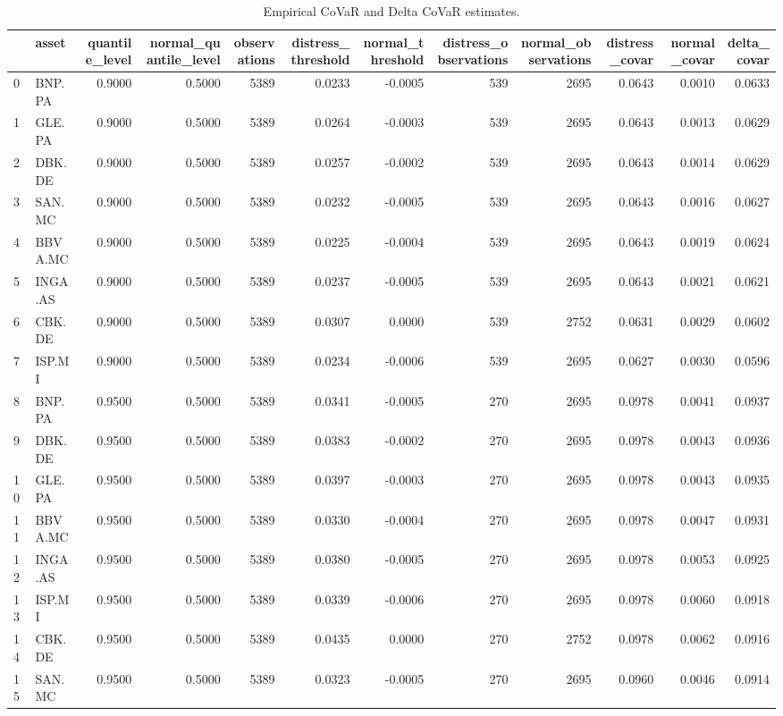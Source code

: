 \begin{table}
\caption{Empirical CoVaR and Delta CoVaR estimates.}
\label{tab:covar_empirical}
\begin{tabular}{llrrrrrrrrrr}
\toprule
 & asset & quantile_level & normal_quantile_level & observations & distress_threshold & normal_threshold & distress_observations & normal_observations & distress_covar & normal_covar & delta_covar \\
\midrule
0 & BNP.PA & 0.9000 & 0.5000 & 5389 & 0.0233 & -0.0005 & 539 & 2695 & 0.0643 & 0.0010 & 0.0633 \\
1 & GLE.PA & 0.9000 & 0.5000 & 5389 & 0.0264 & -0.0003 & 539 & 2695 & 0.0643 & 0.0013 & 0.0629 \\
2 & DBK.DE & 0.9000 & 0.5000 & 5389 & 0.0257 & -0.0002 & 539 & 2695 & 0.0643 & 0.0014 & 0.0629 \\
3 & SAN.MC & 0.9000 & 0.5000 & 5389 & 0.0232 & -0.0005 & 539 & 2695 & 0.0643 & 0.0016 & 0.0627 \\
4 & BBVA.MC & 0.9000 & 0.5000 & 5389 & 0.0225 & -0.0004 & 539 & 2695 & 0.0643 & 0.0019 & 0.0624 \\
5 & INGA.AS & 0.9000 & 0.5000 & 5389 & 0.0237 & -0.0005 & 539 & 2695 & 0.0643 & 0.0021 & 0.0621 \\
6 & CBK.DE & 0.9000 & 0.5000 & 5389 & 0.0307 & 0.0000 & 539 & 2752 & 0.0631 & 0.0029 & 0.0602 \\
7 & ISP.MI & 0.9000 & 0.5000 & 5389 & 0.0234 & -0.0006 & 539 & 2695 & 0.0627 & 0.0030 & 0.0596 \\
8 & BNP.PA & 0.9500 & 0.5000 & 5389 & 0.0341 & -0.0005 & 270 & 2695 & 0.0978 & 0.0041 & 0.0937 \\
9 & DBK.DE & 0.9500 & 0.5000 & 5389 & 0.0383 & -0.0002 & 270 & 2695 & 0.0978 & 0.0043 & 0.0936 \\
10 & GLE.PA & 0.9500 & 0.5000 & 5389 & 0.0397 & -0.0003 & 270 & 2695 & 0.0978 & 0.0043 & 0.0935 \\
11 & BBVA.MC & 0.9500 & 0.5000 & 5389 & 0.0330 & -0.0004 & 270 & 2695 & 0.0978 & 0.0047 & 0.0931 \\
12 & INGA.AS & 0.9500 & 0.5000 & 5389 & 0.0380 & -0.0005 & 270 & 2695 & 0.0978 & 0.0053 & 0.0925 \\
13 & ISP.MI & 0.9500 & 0.5000 & 5389 & 0.0339 & -0.0006 & 270 & 2695 & 0.0978 & 0.0060 & 0.0918 \\
14 & CBK.DE & 0.9500 & 0.5000 & 5389 & 0.0435 & 0.0000 & 270 & 2752 & 0.0978 & 0.0062 & 0.0916 \\
15 & SAN.MC & 0.9500 & 0.5000 & 5389 & 0.0323 & -0.0005 & 270 & 2695 & 0.0960 & 0.0046 & 0.0914 \\

\end{tabular}
\end{table}
